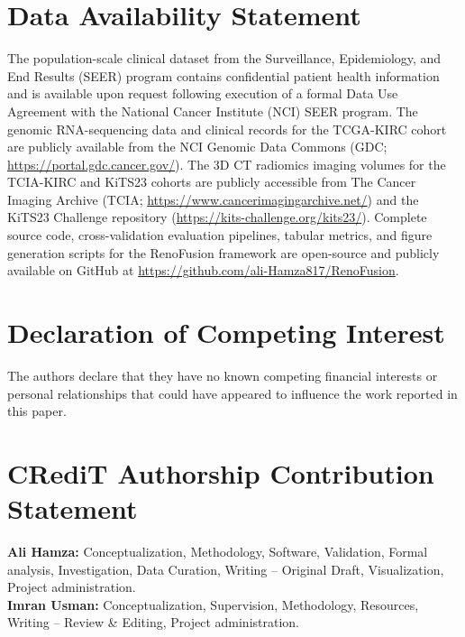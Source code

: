 \section*{Data Availability Statement}
The population-scale clinical dataset from the Surveillance, Epidemiology, and End Results (SEER) program contains confidential patient health information and is available upon request following execution of a formal Data Use Agreement with the National Cancer Institute (NCI) SEER program. The genomic RNA-sequencing data and clinical records for the TCGA-KIRC cohort are publicly available from the NCI Genomic Data Commons (GDC; \url{https://portal.gdc.cancer.gov/}). The 3D CT radiomics imaging volumes for the TCIA-KIRC and KiTS23 cohorts are publicly accessible from The Cancer Imaging Archive (TCIA; \url{https://www.cancerimagingarchive.net/}) and the KiTS23 Challenge repository (\url{https://kits-challenge.org/kits23/}). Complete source code, cross-validation evaluation pipelines, tabular metrics, and figure generation scripts for the RenoFusion framework are open-source and publicly available on GitHub at \url{https://github.com/ali-Hamza817/RenoFusion}.

\section*{Declaration of Competing Interest}
The authors declare that they have no known competing financial interests or personal relationships that could have appeared to influence the work reported in this paper.

\section*{CRediT Authorship Contribution Statement}
\textbf{Ali Hamza:} Conceptualization, Methodology, Software, Validation, Formal analysis, Investigation, Data Curation, Writing -- Original Draft, Visualization, Project administration. \\
\textbf{Imran Usman:} Conceptualization, Supervision, Methodology, Resources, Writing -- Review \& Editing, Project administration.
